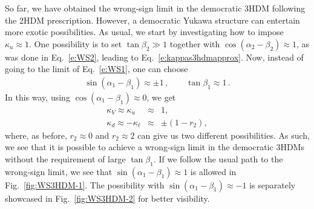\documentclass[11pt]{article}
\begin{document}
%
So far, we have obtained the wrong-sign limit in the democratic 3HDM following the 2HDM prescription.  
However, a democratic Yukawa structure can entertain more exotic possibilities.  
As usual, we start by investigating how to impose $\kappa_u \approx 1$.  
One possibility is to set $\tan\beta_2 \gg 1$ together with $\cos\left(\alpha_2 -\beta_2\right) \approx 1$, as was done in Eq.~\eqref{e:WS2}, leading to Eq.~\eqref{e:kappas3hdmapprox}.  
Now, instead of going to the limit of Eq.~\eqref{e:WS1}, one can choose 
%
\begin{eqnarray}
\sin\left(\alpha_1 - \beta_1\right) \approx \pm 1 \, , \qquad \tan\beta_1 \approx 1\, .
\end{eqnarray}
%  
In this way, using $\cos\left(\alpha_1-\beta_1\right) \approx 0$, we get
\begin{subequations}
\begin{eqnarray}
\kappa_V \approx \kappa_u &\approx& 1 , \\
%
\kappa_d \approx -\kappa_\ell &\approx& \pm \left(1-r_2\right) ,
\end{eqnarray}
\end{subequations}
%
where, as before, $r_2\approx 0$ and $r_2\approx 2$ can give us two different
possibilities.
As such, we see that it is possible to achieve a wrong-sign limit in the democratic 3HDMs without the requirement of large $\tan\beta_1$.  
If we follow the usual path to the wrong-sign limit, we see that $\sin\left(\alpha_1-\beta_1\right) \approx 1$ is allowed in Fig.~\ref{fig:WS3HDM-1}.  
The possibility with $\sin\left(\alpha_1-\beta_1\right) \approx -1$ is separately showcased in Fig.~\ref{fig:WS3HDM-2} for better visibility.  
%
\end{document}

